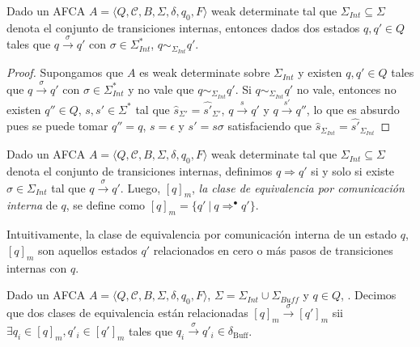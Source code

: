 \begin{prop}
Dado un AFCA $A = \langle Q, \mathcal{C}, B, \Sigma, \delta, q_0, F \rangle$ weak determinate tal que $\Sigma_\mathit{Int} \subseteq \Sigma$ denota el conjunto de transiciones internas, entonces dados dos estados $q, q' \in Q$ tales que $q \xrightarrow{\sigma} q'$ con $\sigma \in \Sigma_{\mathit{Int}}^*$,  $q \sim_{\Sigma_\mathit{Int}} q'$.
\end{prop}
\begin{proof}
Supongamos que $A$ es weak determinate sobre $\Sigma_\mathit{Int}$ y existen $q, q' \in Q$ tales que $q \xrightarrow{\sigma} q'$ con $\sigma \in \Sigma_{\mathit{Int}}^*$ y no vale que $q \sim_{\Sigma_\mathit{Int}} q'$. Si $q \sim_{\Sigma_\mathit{Int}} q'$ no vale, entonces no existen $q'' \in Q$,  $s, s' \in \Sigma^*$ tal que $\widehat{s}_{\Sigma'} = \widehat{s'}_{\Sigma'}$, $q \xrightarrow{s} q'$ y $q \xrightarrow{s'} q''$, lo que es absurdo pues se puede tomar $q'' = q$, $s = \epsilon$ y $s' = s\sigma$ satisfaciendo que $\widehat{s}_{\Sigma_\mathit{Int}} = \widehat{s'}_{\Sigma_\mathit{Int}}$
\end{proof}

\begin{definition}
Dado un AFCA $A = \langle Q, \mathcal{C}, B, \Sigma, \delta, q_0, F \rangle$ weak determinate tal que $\Sigma_\mathit{Int} \subseteq \Sigma$ denota el conjunto de transiciones internas, definimos $q \Rightarrow q'$ si y solo si existe $\sigma \in \Sigma_\mathit{Int}$ tal que $q \xrightarrow{\sigma} q'$. Luego, $[q]_m$, \emph{la clase de equivalencia por comunicación interna} de $q$, se define como $[q]_m = \{q'\ |\ q \Rightarrow^\bullet q'\}$. 
\end{definition}

Intuitivamente, la clase de equivalencia por comunicación interna de un estado $q$, $[q]_m$ son aquellos estados $q'$ relacionados en cero o más pasos de transiciones internas con $q$.

Dado un AFCA $A = \langle Q, \mathcal{C}, B, \Sigma, \delta, q_0, F \rangle$, $\Sigma = \Sigma_\mathit{Int} \cup \Sigma_\mathit{Buff}$ y $q \in Q$, . Decimos que dos clases de equivalencia están relacionadas $[q]_m \xrightarrow{\sigma} [q']_m$ sii $\exists q_i \in [q]_m, q'_i \in [q']_m$ tales que $q_i \xrightarrow{\sigma} q'_i \in \delta_{\text{Buff}}$.

